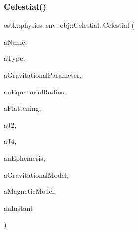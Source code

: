 \subsubsection{\texorpdfstring{Celestial()}{Celestial()}\hspace{0.1cm}{\footnotesize\ttfamily [1/2]}}
{\footnotesize\ttfamily ostk\+::physics\+::env\+::obj\+::\+Celestial\+::\+Celestial (\begin{DoxyParamCaption}\item[{const String \&}]{a\+Name,  }\item[{const \hyperlink{classostk_1_1physics_1_1env_1_1obj_1_1_celestial_aa0711d887522b35b2b3630156d912779}{Celestial\+::\+Type} \&}]{a\+Type,  }\item[{const \hyperlink{classostk_1_1physics_1_1units_1_1_derived}{Derived} \&}]{a\+Gravitational\+Parameter,  }\item[{const \hyperlink{classostk_1_1physics_1_1units_1_1_length}{Length} \&}]{an\+Equatorial\+Radius,  }\item[{const Real \&}]{a\+Flattening,  }\item[{const Real \&}]{a\+J2,  }\item[{const Real \&}]{a\+J4,  }\item[{const Shared$<$ \hyperlink{classostk_1_1physics_1_1env_1_1_ephemeris}{Ephemeris} $>$ \&}]{an\+Ephemeris,  }\item[{const Shared$<$ \hyperlink{namespaceostk_1_1physics_1_1env_1_1obj_a50c0bc72e8880f2fa2a910a81e050c97}{Gravitational\+Model} $>$ \&}]{a\+Gravitational\+Model,  }\item[{const Shared$<$ \hyperlink{namespaceostk_1_1physics_1_1env_1_1obj_a11552c1290e2f6b4693ea00c2df2c80d}{Magnetic\+Model} $>$ \&}]{a\+Magnetic\+Model,  }\item[{const \hyperlink{classostk_1_1physics_1_1time_1_1_instant}{Instant} \&}]{an\+Instant }\end{DoxyParamCaption})}

\mbox{\label{classostk_1_1physics_1_1env_1_1obj_1_1_celestial_aa7e7d7dbde7fae72ffbd859448f5397a}} 

